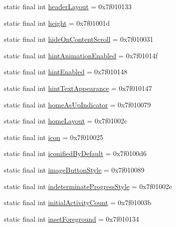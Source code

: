 \begin{CompactItemize}
static final int \hyperlink{classandroid_1_1support_1_1v7_1_1cardview_1_1_r_1_1attr_512d281a9e164d20e005cbe949e62e39}{headerLayout} = 0x7f010133
\item 
static final int \hyperlink{classandroid_1_1support_1_1v7_1_1cardview_1_1_r_1_1attr_7aef737b4ba0d5908354dcf71deb69bb}{height} = 0x7f01001d
\item 
static final int \hyperlink{classandroid_1_1support_1_1v7_1_1cardview_1_1_r_1_1attr_de9b4c23961d3e8094ac7a6f9a49d5b2}{hideOnContentScroll} = 0x7f010031
\item 
static final int \hyperlink{classandroid_1_1support_1_1v7_1_1cardview_1_1_r_1_1attr_74101dcc5aa4421c9180b320b01d05e8}{hintAnimationEnabled} = 0x7f01014f
\item 
static final int \hyperlink{classandroid_1_1support_1_1v7_1_1cardview_1_1_r_1_1attr_5c0eb356a8bc9a4dcb5c7cd15bf671e0}{hintEnabled} = 0x7f010148
\item 
static final int \hyperlink{classandroid_1_1support_1_1v7_1_1cardview_1_1_r_1_1attr_2a1d0df9d22bd5fe16baa2bc1ee11a7d}{hintTextAppearance} = 0x7f010147
\item 
static final int \hyperlink{classandroid_1_1support_1_1v7_1_1cardview_1_1_r_1_1attr_d99376fd18f1af9562f7424921e3ef88}{homeAsUpIndicator} = 0x7f010079
\item 
static final int \hyperlink{classandroid_1_1support_1_1v7_1_1cardview_1_1_r_1_1attr_90ff2905ef249911ce22255c5ccaa62e}{homeLayout} = 0x7f01002c
\item 
static final int \hyperlink{classandroid_1_1support_1_1v7_1_1cardview_1_1_r_1_1attr_307d3d873ad01ff0e7d1d47d49a6609c}{icon} = 0x7f010025
\item 
static final int \hyperlink{classandroid_1_1support_1_1v7_1_1cardview_1_1_r_1_1attr_95887351e7f20df528e63ecb62d29ef5}{iconifiedByDefault} = 0x7f0100d6
\item 
static final int \hyperlink{classandroid_1_1support_1_1v7_1_1cardview_1_1_r_1_1attr_d0b1b0350ed6da0a5130246484d3d9b2}{imageButtonStyle} = 0x7f010089
\item 
static final int \hyperlink{classandroid_1_1support_1_1v7_1_1cardview_1_1_r_1_1attr_7d32843f126e39bc6ee5b7cd981ba613}{indeterminateProgressStyle} = 0x7f01002e
\item 
static final int \hyperlink{classandroid_1_1support_1_1v7_1_1cardview_1_1_r_1_1attr_96e5cbc0898cb984f48973d708f52c4d}{initialActivityCount} = 0x7f01003b
\item 
static final int \hyperlink{classandroid_1_1support_1_1v7_1_1cardview_1_1_r_1_1attr_1be2094d6a26f9c0d3287c7f61cf2493}{insetForeground} = 0x7f010134

\end{CompactItemize}
